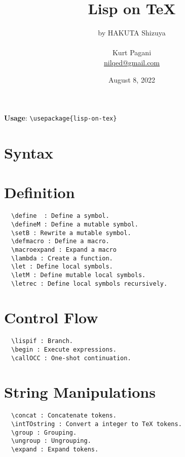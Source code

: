 \documentclass[a4paper,landscape,columns=3]{cheatsheet}
\title{Lisp on \TeX}
\author{by HAKUTA Shizuya \\
\\Kurt Pagani\\\href{mailto:nilqed@gmail.com}{nilqed@gmail.com}}
\date{August 8, 2022}
\newcommand{\pT}[1]{\texttt{\textbackslash #1}}
\begin{document}
\maketitle
%
\textbf{Usage}: \pT{usepackage\{lisp-on-tex\}}

\section{Syntax}
%
\section{Definition}
\begin{lstlisting}
  \define  : Define a symbol.
  \defineM : Define a mutable symbol.
  \setB : Rewrite a mutable symbol.
  \defmacro : Define a macro.
  \macroexpand : Expand a macro
  \lambda : Create a function.
  \let : Define local symbols.
  \letM : Define mutable local symbols.
  \letrec : Define local symbols recursively.
\end{lstlisting}
%
\section{Control Flow}
\begin{lstlisting}
  \lispif : Branch.
  \begin : Execute expressions.
  \callOCC : One-shot continuation.
\end{lstlisting}
%
%
\section{String Manipulations}
\begin{lstlisting}
  \concat : Concatenate tokens.
  \intTOstring : Convert a integer to TeX tokens.
  \group : Grouping.
  \ungroup : Ungrouping.
  \expand : Expand tokens.
\end{lstlisting}
%
%
\end{document}
